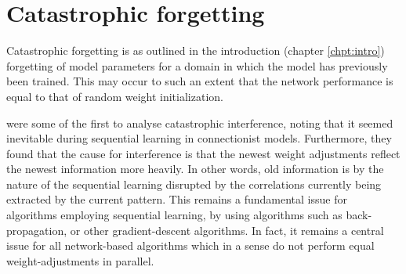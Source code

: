 \section{Catastrophic forgetting}\label{chpt:catastrophic-forgetting}

Catastrophic forgetting \citep{McCloskey1989, Ratcliff1990} is as outlined in the introduction (chapter \ref{chpt:intro}) forgetting of model parameters for a domain in which the model has previously been trained. This may occur to such an extent that the network performance is equal to that of random weight initialization.

\cite{McCloskey1989} were some of the first to analyse catastrophic interference, noting that it seemed inevitable during sequential learning in connectionist models. Furthermore, they found that the cause for interference is that the newest weight adjustments reflect the newest information more heavily. In other words, old information is by the nature of the sequential learning disrupted by the correlations currently being extracted by the current pattern. This remains a fundamental issue for algorithms employing sequential learning, by using algorithms such as back-propagation, or other gradient-descent algorithms. In fact, it remains a central issue for all network-based algorithms which in a sense do not perform equal weight-adjustments in parallel.

